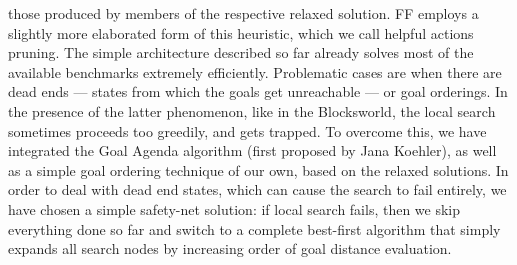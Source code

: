 \documentclass[12pt]{article}
\begin{document}
\begin{enumerate}
\begin{itemize}
those produced by members of the respective relaxed solution. FF employs a slightly more elaborated form of this heuristic, which we call helpful actions pruning. The simple architecture described so far already solves most of the available benchmarks extremely efficiently. Problematic cases are when there are dead ends --- states from which the goals get unreachable --- or goal orderings. In the presence of the latter phenomenon, like in the Blocksworld, the local search sometimes proceeds too greedily, and gets trapped. To overcome this, we have integrated the Goal Agenda algorithm (first proposed by Jana Koehler), as well as a simple goal ordering technique of our own, based on the relaxed solutions. In order to deal with dead end states, which can cause the search to fail entirely, we have chosen a simple safety-net solution: if local search fails, then we skip everything done so far and switch to a complete best-first algorithm that simply expands all search nodes by increasing order of goal distance 
evaluation.
    \end{itemize}
    

\end{enumerate}
\end{document}
